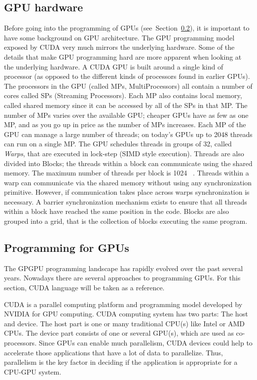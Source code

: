 \documentclass[Ingles]{ic-tese-v1}
\newcommand{\rsec}[1]{Section~\ref{sec:#1}}
\newcommand{\tit}[1]{{\textit{#1}}}
\begin{document}
\subsection{GPU hardware}
\label{sec:gpugardware}
Before going into the programming of GPUs (see~\rsec{gpuprogramming}), it is
important to have some background on GPU architecture.  The GPU programming
model exposed by CUDA very much mirrors the underlying hardware. Some of the
details that make GPU programming hard are more apparent when looking at the
underlying hardware.  A CUDA GPU is built around a single kind of processor (as
opposed to the different kinds of processors found in earlier GPUs). The
processors in the GPU (called MPs, MultiProcessors) all contain a number of
cores called SPs (Streaming Processors).  Each MP also contains local memory,
called shared memory since it can be accessed by all of the SPs in that MP. The
number of MPs varies over the available GPU; cheaper GPUs have as few as one
MP, and as you go up in price as the number of MPs increases.  Each MP of the GPU
can manage a large number of threads; on today’s GPUs up to 2048 threads can
run on a single MP. The GPU schedules threads in groups of 32, called \tit{Warps},
that are executed in lock-step (SIMD style execution). Threads are also divided
into Blocks; the threads within a block can communicate using the shared
memory. The maximum number of threads per block is 1024
~\cite{NvidiaGuide2018}. Threads within a warp can communicate via the shared
memory without using any synchronization primitive. However, if communication
takes place across warps synchronization is necessary. A barrier
synchronization mechanism exists to ensure that all threads within a block have
reached the same position in the code. Blocks are also grouped into a grid,
that is the collection of blocks executing the same program.

\subsection{Programming for GPUs}
\label{sec:gpuprogramming}
The GPGPU programming landscape has rapidly evolved over the past several
years. Nowadays there are several approaches to
programming GPUs. For this section, CUDA language will be taken as a reference.

CUDA is a parallel computing platform and programming model developed by NVIDIA
 for GPU computing.  CUDA computing system has two parts: The host and
device.  The host part is one or many traditional CPU(s) like Intel or AMD
CPUs. The device part consists of one or several GPU(s), which are used as
co-processors. Since GPUs can enable much  parallelism, CUDA devices could
help to accelerate those applications that have a lot of data to  parallelize.
Thus, parallelism is the key factor in deciding if the application is appropriate
for a CPU-GPU system.
\end{document}
